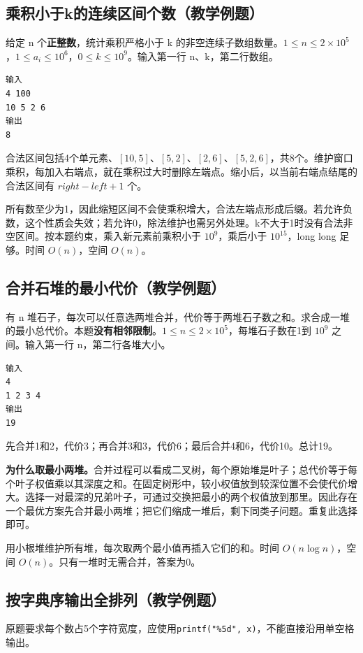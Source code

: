 \subsection{乘积小于k的连续区间个数（教学例题）}

给定 n 个\textbf{正整数}，统计乘积严格小于 k 的非空连续子数组数量。$1\le n\le2\times10^5$，$1\le a_i\le10^6$，$0\le k\le10^9$。输入第一行 n、k，第二行数组。
\begin{verbatim}
输入
4 100
10 5 2 6
输出
8
\end{verbatim}
合法区间包括4个单元素、$[10,5]$、$[5,2]$、$[2,6]$、$[5,2,6]$，共8个。维护窗口乘积，每加入右端点，就在乘积过大时删除左端点。缩小后，以当前右端点结尾的合法区间有 $right-left+1$ 个。

所有数至少为1，因此缩短区间不会使乘积增大，合法左端点形成后缀。若允许负数，这个性质会失效；若允许0，除法维护也需另外处理。k不大于1时没有合法非空区间。按本题约束，乘入新元素前乘积小于 $10^9$，乘后小于 $10^{15}$，long long 足够。时间 $O(n)$，空间 $O(n)$。
\subsection{合并石堆的最小代价（教学例题）}

有 n 堆石子，每次可以任意选两堆合并，代价等于两堆石子数之和。求合成一堆的最小总代价。本题\textbf{没有相邻限制}。$1\le n\le2\times10^5$，每堆石子数在1到 $10^9$ 之间。输入第一行 n，第二行各堆大小。
\begin{verbatim}
输入
4
1 2 3 4
输出
19
\end{verbatim}
先合并1和2，代价3；再合并3和3，代价6；最后合并4和6，代价10。总计19。

\textbf{为什么取最小两堆。}合并过程可以看成二叉树，每个原始堆是叶子；总代价等于每个叶子权值乘以其深度之和。在固定树形中，较小权值放到较深位置不会使代价增大。选择一对最深的兄弟叶子，可通过交换把最小的两个权值放到那里。因此存在一个最优方案先合并最小两堆；把它们缩成一堆后，剩下同类子问题。重复此选择即可。

用小根堆维护所有堆，每次取两个最小值再插入它们的和。时间 $O(n\log n)$，空间 $O(n)$。只有一堆时无需合并，答案为0。
\subsection{按字典序输出全排列（教学例题）}

原题要求每个数占5个字符宽度，应使用\texttt{printf("\%5d", x)}，不能直接沿用单空格输出。

